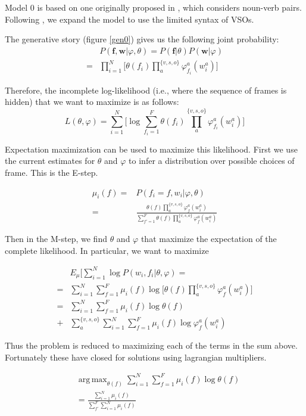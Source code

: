 \documentclass[11pt,twocolumn,DIV=11]{scrartcl}
\renewcommand\phi\varphi
\DeclareMathOperator*{\argmax}{arg\,max}
\begin{document}
Model 0 is based on one originally proposed in \citet{rooth1999}, which 
considers noun-verb pairs. Following \citet{oconnor2013}, we expand the model
to use the limited syntax of VSOs.

The generative story (figure \ref{gen0}) gives us the following joint probability:
\begin{align*}
&P(\mathbf{f},\mathbf{w}|\phi,\theta) 
  = P(\mathbf{f}|\theta)P(\mathbf{w}|\phi)\\
  =& \prod_{i=1}^{N}\big[\theta(f_i) \prod_a^{\{v,s,o\}}\phi_{f_i}^a(w_i^a)\big]
\end{align*}

Therefore, the incomplete log-likelihood (i.e., where the sequence of frames
is hidden) that we want to maximize is as follows:
\[
L(\theta,\phi) = \sum_{i=1}^N\big[\log \sum_{f_i=1}^F\theta(f_i)\prod_{a}^{\{v,s,o\}}\phi_{f_i}^a(w^a_i)\big]
\]

Expectation maximization can be used to maximize this likelihood.
First we use the current estimates for $\theta$ and $\phi$ to infer a 
distribution over possible choices of frame. This is the E-step. 

\begin{align}
\mu_i(f) =& P(f_i=f, w_i|\phi,\theta)\nonumber\\
=& \frac{\theta(f)\prod_a^{\{v,s,o\}}\phi_f^a(w^a_i)}
                {\sum_{f'=1}^F\theta(f)\prod_a^{\{v,s,o\}}\phi_f^a(w^a_i)}\label{E}
\end{align}

Then in the M-step, we find $\theta$ and $\phi$ that maximize the expectation of
the complete likelihood. In particular, we want to maximize

\begin{align*}
&E_\mu\big[\sum_{i=1}^N\log P(w_i,f_i|\theta,\phi) =\\
=& \sum_{i=1}^N\sum_{f=1}^F\mu_i(f)\log\Big[\theta(f)\prod_a^{\{v,s,o\}}\phi_f^a(w_i^a)\Big]\\
=& \sum_{i=1}^N\sum_{f=1}^F\mu_i(f)\log\theta(f)\\
+& \sum_a^{\{v,s,o\}} \sum_{i=1}^N\sum_{f=1}^F\mu_i(f)\log \phi_f^a(w_i^a)
\end{align*}

Thus the problem is reduced to maximizing each of the terms in the sum above. Fortunately
these have closed for solutions using lagrangian multipliers.


\begin{align}
&\argmax_{\theta(f)}\sum_{i=1}^N\sum_{f=1}^F\mu_i(f)\log\theta(f)\nonumber\\
&= \frac{\sum_{i=1}^N\mu_i(f)}{\sum_{f'}^F\sum_{i=1}^N\mu_i(f)}
\end{align}
\end{document}
